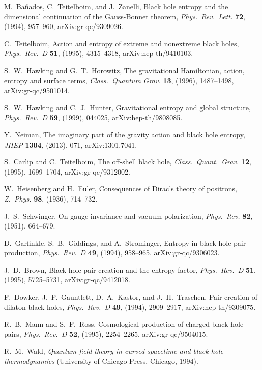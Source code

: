 \documentclass[12pt]{article}
\begin{document}
\begin{thebibliography}{999}
 M.\ Ba{\~n}ados, C.\ Teitelboim, and J.\ Zanelli, 
Black hole entropy and the dimensional continuation of the 
Gauss-Bonnet theorem, \emph{Phys.\ Rev.\ Lett.} {\bf 72},  
(1994), 957--960, arXiv:gr-qc/9309026.

 C.\ Teitelboim, Action and entropy of extreme 
and nonextreme black holes, \emph{Phys.\ Rev.\ D} {\bf 51}, (1995),  
4315--4318, arXiv:hep-th/9410103.

 S.~W.\ Hawking and G.~T.\ Horowitz,
The gravitational Hamiltonian, action, entropy and surface terms,
\emph{Class.\ Quantum Grav.} {\bf 13}, (1996), 1487--1498,
arXiv:gr-qc/9501014.

 S.~W.\ Hawking and C.\ J.\ Hunter, 
Gravitational entropy and global structure, \emph{Phys.\ Rev.\ D}
{\bf 59}, (1999), 044025, arXiv:hep-th/9808085.

 Y.\ Neiman, The imaginary part of the gravity 
action and black hole entropy, \emph{JHEP} {\bf 1304}, (2013), 
071, arXiv:1301.7041.

 S.\ Carlip and C.\ Teitelboim, The off-shell black 
hole, \emph{Class.\ Quant.\ Grav.} {\bf 12}, (1995), 1699--1704,
arXiv:gr-qc/9312002.

 W.\ Heisenberg and H.\ Euler, Consequences 
of Dirac's theory of positrons, \emph{Z.\ Phys.} {\bf 98}, (1936), 
714--732.

 J.~S.\ Schwinger, On gauge invariance and 
vacuum polarization, \emph{Phys.\ Rev.} {\bf 82}, (1951), 664--679.

 D.\ Garfinkle, S.\ B.\ Giddings, and A.\ Strominger,
Entropy in black hole pair production, \emph{Phys.\ Rev.\ D} {\bf 49}, 
(1994), 958--965, arXiv:gr-qc/9306023.

 J.~D.\ Brown, Black hole pair creation and the entropy 
factor, \emph{Phys.\ Rev.\ D} {\bf 51}, (1995), 5725--5731, 
arXiv:gr-qc/9412018.

 F.\ Dowker, J.~P.\ Gauntlett, D.~A.\ Kastor, and
J.~H.\ Traschen, Pair creation of dilaton black holes, \emph{Phys.\
Rev.\ D} {\bf 49}, (1994), 2909--2917, arXiv:hep-th/9309075.

 R.~B.\ Mann and S.~F.\ Ross, Cosmological 
production of charged black hole pairs, \emph{Phys.\ Rev.\ D}
{\bf 52}, (1995), 2254--2265, arXiv:gr-qc/9504015.

 R.~M.\ Wald, \emph{Quantum field theory in
curved spacetime and black hole thermodynamics} (University of
Chicago Press, Chicago, 1994).


\end{thebibliography}
\end{document}
